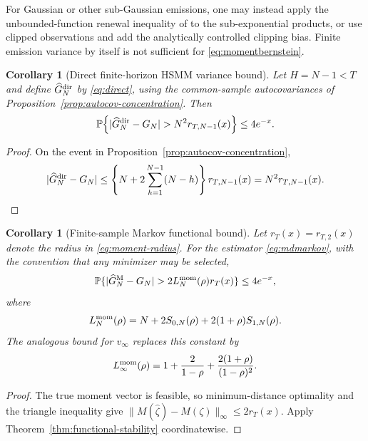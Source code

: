 \documentclass[11pt]{article}
\newtheorem{corollary}[theorem]{Corollary}
\theoremstyle{definition}
\theoremstyle{remark}
\newcommand{\Pp}{\mathbb P}
\begin{document}
For Gaussian or other sub-Gaussian emissions, one may instead apply the
unbounded-function renewal inequality of
\cite{Adamczak2008,AdamczakBednorz2015} to the sub-exponential products, or
use clipped observations and add the analytically controlled clipping bias.
Finite emission variance by itself is not sufficient for
\eqref{eq:momentbernstein}.

\begin{corollary}[Direct finite-horizon HSMM variance bound]
\label{cor:direct-hsmm-bound}
Let $H=N-1<T$ and define $\widehat G_N^{\rm dir}$ by
\eqref{eq:direct}, using the common-sample autocovariances of
Proposition~\ref{prop:autocov-concentration}.  Then
\begin{equation}
 \Pp\!\left\{
 |\widehat G_N^{\rm dir}-G_N|>
 N^2r_{T,N-1}(x)\right\}\le4e^{-x}.
 \label{eq:direct-hsmm-probability}
\end{equation}
\end{corollary}

\begin{proof}
On the event in Proposition~\ref{prop:autocov-concentration},
\[
 |\widehat G_N^{\rm dir}-G_N|
 \le
 \left\{N+2\sum_{h=1}^{N-1}(N-h)\right\}r_{T,N-1}(x)
 =N^2r_{T,N-1}(x).
\]
\end{proof}

\begin{corollary}[Finite-sample Markov functional bound]
\label{cor:markov-bound}
Let $r_T(x)=r_{T,2}(x)$ denote the radius in
\eqref{eq:moment-radius}.
For the estimator \eqref{eq:mdmarkov}, with the convention that any minimizer
may be selected,
\begin{equation}
 \Pp\{ |\widehat G_N^{\rm M}-G_N|>
 2L_N^{\rm mom}(\rho)r_T(x)\}
 \le 4e^{-x},
 \label{eq:markovbound}
\end{equation}
where
\[
 L_N^{\rm mom}(\rho)=
 N+2S_{0,N}(\rho)+2(1+\rho)S_{1,N}(\rho).
\]
The analogous bound for $v_\infty$ replaces this constant by
\[
 L_\infty^{\rm mom}(\rho)=
 1+\frac2{1-\rho}+\frac{2(1+\rho)}{(1-\rho)^2}.
\]
\end{corollary}

\begin{proof}
The true moment vector is feasible, so minimum-distance optimality and the
triangle inequality give
$\|M(\widehat\zeta)-M(\zeta)\|_\infty\le2r_T(x)$.
Apply Theorem~\ref{thm:functional-stability} coordinatewise.
\end{proof}
\end{document}

